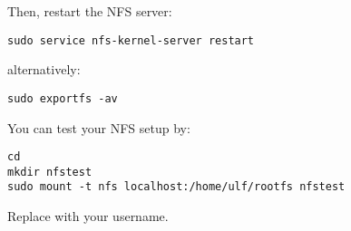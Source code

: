 Then, restart the NFS server:

\begin{verbatim}
sudo service nfs-kernel-server restart
\end{verbatim}

alternatively:

\begin{verbatim}
sudo exportfs -av
\end{verbatim}

You can test your NFS setup by:

\begin{verbatim}
cd
mkdir nfstest
sudo mount -t nfs localhost:/home/ulf/rootfs nfstest
\end{verbatim}

Replace  with your username.
